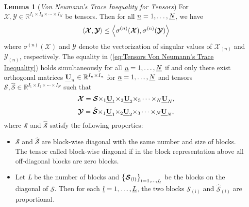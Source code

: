 \documentclass[twocolumn]{svjour3}          %
\begin{document}
    \noindent
    \textbf{Lemma 1} (\emph{Von Neumann's Trace Inequality for Tensors}) \cite{Chr2015Von} For ${\boldsymbol{\mathcal{X}}},{\boldsymbol{\mathcal{Y}}} \in {\mathbb{R}^{{I_1} \times {I_2} \times  \cdots  \times {I_N}}}$ be tensors. Then for all $\emph{n} = 1, \ldots ,\emph{N}$, we have
    \begin{equation}\label{eq:Tensors Von Neumann's Trace Inequality}
    \begin{aligned}
    \setlength{\abovedisplayskip}{2pt}
    \setlength{\belowdisplayskip}{2pt}
    \left\langle {{\boldsymbol{\mathcal{X}}},{\boldsymbol{\mathcal{Y}}}} \right\rangle  \le \left\langle {{\sigma ^{(n)}}({\boldsymbol{\mathcal{X}}}),{\sigma ^{(n)}}({\boldsymbol{\mathcal{Y}}})} \right\rangle
    \end{aligned}
    \end{equation}
    where ${\sigma ^{(n)}}({\boldsymbol{\mathcal{X}}})$ and ${\boldsymbol{\mathcal{Y}}}$ denote the vectorization of singular values of ${{\boldsymbol{\mathcal{X}}}_{(n)}}$ and ${{\boldsymbol{\mathcal{Y}}}_{(n)}}$, respectively. The equality in (\ref{eq:Tensors Von Neumann's Trace Inequality}) holds simultaneously for all $\emph{n} = 1, \ldots ,\emph{N}$ if and only there exist orthogonal matrices ${{\textbf{\emph{U}}}_n} \in {\mathbb{R}^{{I_n} \times {I_n}}}$ for $\emph{n} = 1, \ldots ,\emph{N}$ and tensors ${\boldsymbol{\mathcal{S}}},\hat{\boldsymbol{\mathcal{S}}} \in {\mathbb{R}^{{I_1} \times {I_2} \times  \cdots  \times {I_N}}}$ such that $$ \setlength{\abovedisplayskip}{2pt}
    \setlength{\belowdisplayskip}{2pt}
    {\boldsymbol{\mathcal{X}}} = {\boldsymbol{\mathcal{S}}}{ \times _1}{\textbf{\emph{U}}_1}{ \times _2}{\textbf{\emph{U}}_2}{ \times _3} \cdots { \times _N}{\textbf{\emph{U}}_N},$$
    $$\setlength{\abovedisplayskip}{2pt}
    \setlength{\belowdisplayskip}{2pt}
    {\boldsymbol{\mathcal{Y}}} = \hat{\boldsymbol{\mathcal{S}}}{ \times _1}{\textbf{\emph{U}}_1}{ \times _2}{\textbf{\emph{U}}_2}{ \times _3} \cdots { \times _N}{\textbf{\emph{U}}_N},$$
    where ${\boldsymbol{\mathcal{S}}}$ and $\hat{\boldsymbol{\mathcal{S}}}$ satisfy the following properties:
    \begin{itemize}
      \item ${\boldsymbol{\mathcal{S}}}$ and $\hat{\boldsymbol{\mathcal{S}}}$ are block-wise diagonal with the same number and size of blocks. The tensor called block-wise diagonal if in the block representation above all off-diagonal blocks are zero blocks.
      \item Let \emph{L} be the number of blocks and ${\left\{{{{\boldsymbol{\mathcal{S}}}_{(l)}}} \right\}_{l = 1, \ldots ,\emph{L}}}$ be the blocks on the diagonal of ${\boldsymbol{\mathcal{S}}}$. Then for each $\emph{l} = 1, \ldots ,\emph{L}$, the two blocks ${{\boldsymbol{\mathcal{S}}}_{(l)}}$ and ${\hat{\boldsymbol{\mathcal{S}}}_{(l)}}$ are proportional.
    \end{itemize}
\end{document}
